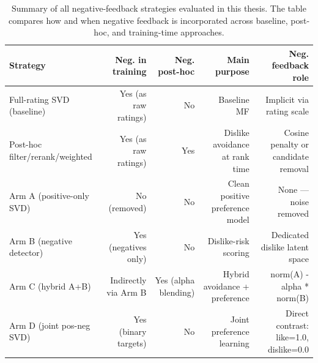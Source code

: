 \begin{table}[ht]
\centering
\caption{Summary of all negative-feedback strategies evaluated in this thesis. The table compares how and when negative feedback is incorporated across baseline, post-hoc, and training-time approaches.}
\begin{tabular}{lrrrr}
\toprule
Strategy & Neg. in training & Neg. post-hoc & Main purpose & Neg. feedback role \\
\midrule
Full-rating SVD (baseline) & Yes (as raw ratings) & No & Baseline MF & Implicit via rating scale \\
Post-hoc filter/rerank/weighted & Yes (as raw ratings) & Yes & Dislike avoidance at rank time & Cosine penalty or candidate removal \\
Arm A (positive-only SVD) & No (removed) & No & Clean positive preference model & None — noise removed \\
Arm B (negative detector) & Yes (negatives only) & No & Dislike-risk scoring & Dedicated dislike latent space \\
Arm C (hybrid A+B) & Indirectly via Arm B & Yes (alpha blending) & Hybrid avoidance + preference & norm(A) - alpha * norm(B) \\
Arm D (joint pos-neg SVD) & Yes (binary targets) & No & Joint preference learning & Direct contrast: like=1.0, dislike=0.0 \\
\bottomrule
\end{tabular}
\end{table}